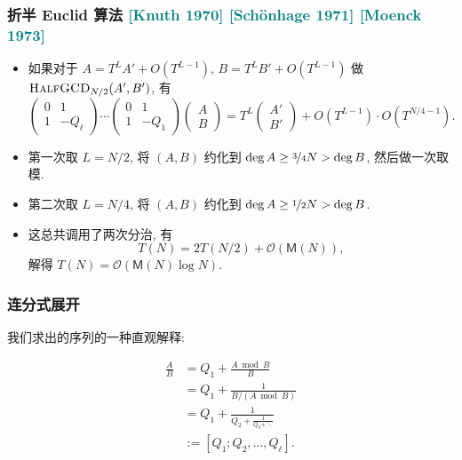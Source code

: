 \documentclass{ctexbeamer}
\newcommand{\cnote}[2][\footnotesize]{\textcolor{teal}{#1[#2]}}
\newcommand{\bigO}{\mathcal O}
\begin{document}
\begin{frame}
  \frametitle{折半 Euclid 算法 \cnote{Knuth 1970} \cnote{Sch\"onhage 1971} \cnote{Moenck 1973}}

  \begin{itemize}
    \item<1-> 如果对于 $A = T^L A' + O(T^{L-1})$, $B = T^L B' + O(T^{L-1})$ 做
    $\textsc{HalfGCD}_{N/2}(A', B')$, 有
    \begin{equation}
      \begin{pmatrix}
        0 & 1 \\ 1 & -Q_\ell
      \end{pmatrix} \cdots \begin{pmatrix}
        0 & 1 \\ 1 & -Q_1
      \end{pmatrix} 
      \begin{pmatrix}
        A\\ B
      \end{pmatrix}
      = T^L\begin{pmatrix}
        A' \\ B'
      \end{pmatrix} + O(T^{L-1}) \cdot O(T^{N/4 - 1}).
    \end{equation}
    \item<2-> 第一次取 $L = N/2$, 将 $(A, B)$ 约化到 $\deg A \geq \nicefrac{3}{4} N > \deg B$,
    然后做一次取模.
    \item<3-> 第二次取 $L = N/4$, 将 $(A, B)$ 约化到 $\deg A \geq \nicefrac{1}{2} N > \deg B$.
    \item<4-> 这总共调用了两次分治, 有
    \begin{equation}
      T(N) = 2T(N/2) + \bigO(\mathsf M(N)),
    \end{equation}
    解得 $T(N) = \bigO(\mathsf{M}(N) \log N)$.
  \end{itemize}

\end{frame}

\begin{frame}
  \frametitle{连分式展开}

  我们求出的序列的一种直观解释:

  \begin{align}
    \frac A B &= Q_1 + \frac{A\bmod B}{B}\\
    &= Q_1 + \frac 1{B / (A \bmod B)}\\
    &= Q_1 + \frac 1{Q_2 + \frac 1{Q_3 + \ddots}}\\
    &:= [Q_1; Q_2,\dots, Q_\ell].
  \end{align}

\end{frame}
\end{document}
